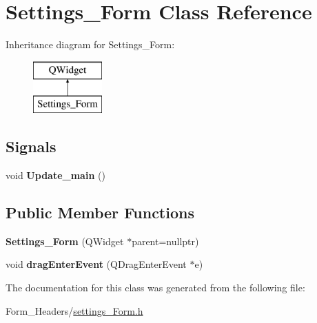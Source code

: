 \hypertarget{class_settings___form}{}\section{Settings\+\_\+\+Form Class Reference}
\label{class_settings___form}
Inheritance diagram for Settings\+\_\+\+Form\+:\begin{figure}[H]
\begin{center}
\leavevmode
\includegraphics[height=2.000000cm]{class_settings___form}
\end{center}
\end{figure}
\subsection*{Signals}
\begin{DoxyCompactItemize}
\item 
\mbox{\label{class_settings___form_a953f2c81adab548f48e080aab25d6440}} 
void {\bfseries Update\+\_\+main} ()
\end{DoxyCompactItemize}
\subsection*{Public Member Functions}
\begin{DoxyCompactItemize}
\item 
\mbox{\label{class_settings___form_a33decfb2879dd45557b72580389455e6}} 
{\bfseries Settings\+\_\+\+Form} (Q\+Widget $\ast$parent=nullptr)
\item 
\mbox{\label{class_settings___form_a2e9af3d94cc953fc80677d0d8ec898f3}} 
void {\bfseries drag\+Enter\+Event} (Q\+Drag\+Enter\+Event $\ast$e)
\end{DoxyCompactItemize}


The documentation for this class was generated from the following file\+:\begin{DoxyCompactItemize}
\item 
Form\+\_\+\+Headers/\mbox{\hyperlink{settings___form_8h}{settings\+\_\+\+Form.\+h}}\end{DoxyCompactItemize}
